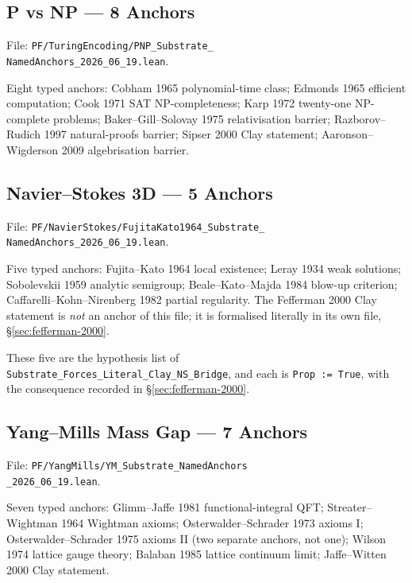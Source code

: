 \subsection{P vs NP --- 8 Anchors}
\label{subsec:phase-1-pnp}

File: \texttt{PF/TuringEncoding/PNP\_Substrate\_\\
NamedAnchors\_2026\_06\_19.lean}.

Eight typed anchors: Cobham 1965 polynomial-time class; Edmonds
1965 efficient computation; Cook 1971 SAT NP-completeness; Karp
1972 twenty-one NP-complete problems; Baker--Gill--Solovay 1975
relativisation barrier; Razborov--Rudich 1997 natural-proofs
barrier; Sipser 2000 Clay statement; Aaronson--Wigderson 2009
algebrisation barrier.

\subsection{Navier--Stokes 3D --- 5 Anchors}
\label{subsec:phase-1-ns}

File: \texttt{PF/NavierStokes/FujitaKato1964\_Substrate\_\\
NamedAnchors\_2026\_06\_19.lean}.

Five typed anchors: Fujita--Kato 1964 local existence; Leray 1934
weak solutions; Sobolevskii 1959 analytic semigroup;
Beale--Kato--Majda 1984 blow-up criterion;
Caffarelli--Kohn--Nirenberg 1982 partial regularity. The Fefferman
2000 Clay statement is \emph{not} an anchor of this file; it is
formalised literally in its own file, \S\ref{sec:fefferman-2000}.

These five are the hypothesis list of
\verb|Substrate_Forces_Literal_Clay_NS_Bridge|, and each is
\verb|Prop := True|, with the consequence recorded in
\S\ref{sec:fefferman-2000}.

\subsection{Yang--Mills Mass Gap --- 7 Anchors}
\label{subsec:phase-1-ym}

File: \texttt{PF/YangMills/YM\_Substrate\_NamedAnchors\\
\_2026\_06\_19.lean}.

Seven typed anchors: Glimm--Jaffe 1981 functional-integral QFT;
Streater--Wightman 1964 Wightman axioms; Osterwalder--Schrader
1973 axioms I; Osterwalder--Schrader 1975 axioms II (two separate
anchors, not one); Wilson 1974 lattice gauge theory; Balaban 1985
lattice continuum limit; Jaffe--Witten 2000 Clay statement.

